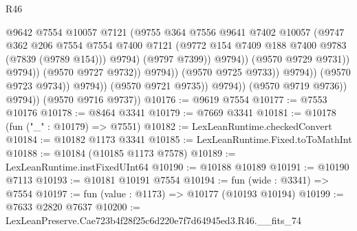 \begin{lexlean}{R46}
\begin{coremodule}
                                              @9642
                                              @7554
                                              @10057
                                              @7121
                                              (@9755
                                                @364
                                                @7556
                                                @9641
                                                @7402
                                                @10057
                                                (@9747
                                                  @362
                                                  @206
                                                  @7554
                                                  @7554
                                                  @7400
                                                  @7121
                                                  (@9772
                                                    @154
                                                    @7409
                                                    @188
                                                    @7400
                                                    @9783
                                                    (@7839 (@9789 @154)))
                                                  @9794)
                                                (@9797 @7399))
                                              @9794))
                                          (@9570 @9729 @9731))
                                        @9794))
                                    (@9570 @9727 @9732))
                                  @9794))
                              (@9570 @9725 @9733))
                            @9794))
                        (@9570 @9723 @9734))
                      @9794))
                  (@9570 @9721 @9735))
                @9794))
            (@9570 @9719 @9736))
          @9794))
      (@9570 @9716 @9737))
@10176 := @9619 @7554
@10177 := @7553 @10176
@10178 := @8464 @3341
@10179 := @7669 @3341
@10181 := @10178 (fun ("_" : @10179) => @7551)
@10182 := LexLeanRuntime.checkedConvert
@10184 := @10182 @1173 @3341
@10185 := LexLeanRuntime.Fixed.toToMathInt
@10188 := @10184 (@10185 @1173 @7578)
@10189 := LexLeanRuntime.instFixedUInt64
@10190 := @10188 @10189
@10191 := @10190 @7113
@10193 := @10181 @10191 @7554
@10194 := fun (wide : @3341) => @7554
@10197 := fun (value : @1173) => @10177 (@10193 @10194)
@10199 := @7633 @2820 @7637
@10200 := LexLeanPreserve.Cae723b4f28f25c6d220e7f7d64945ed3.R46.__fits_74

\end{coremodule}
\end{lexlean}
